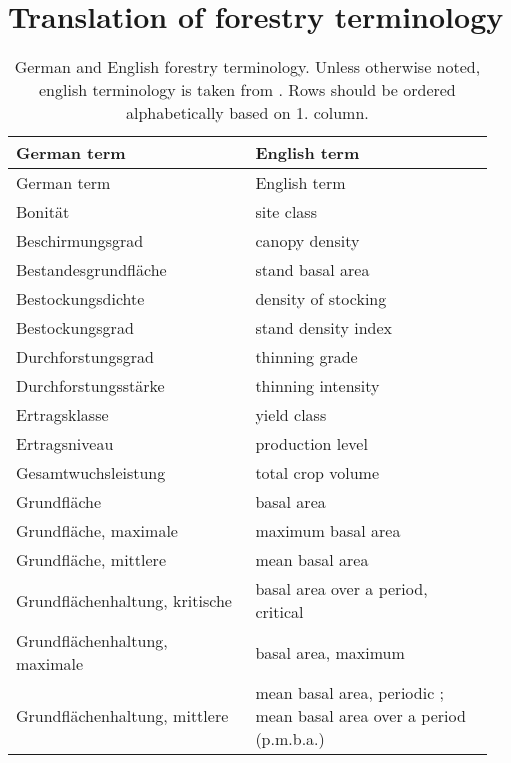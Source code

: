 \section{Translation of forestry terminology}

\begin{singlespace}
  {\tabulinesep=2mm
    \begin{longtabu}{p{0.475\linewidth} p{0.475\linewidth}}
      \caption{German and English forestry terminology. Unless otherwise noted, english terminology is taken from \textcite{Schmid-Haas1990}.  Rows should be ordered alphabetically based on 1. column.} \\
      \toprule
      German term & English term \\
      \midrule
      \endfirsthead
      German term & English term \\
      \midrule
      \endhead
      \bottomrule
      \endlastfoot
      Bonität & site class \\
      Beschirmungsgrad & canopy density \\
      Bestandesgrundfläche & stand basal area \\
      Bestockungsdichte & density of stocking \parencite[p.~38]{EFARES1953} \\
      Bestockungsgrad & stand density index \\
      Durchforstungsgrad & thinning grade \\
      Durchforstungsstärke & thinning intensity \\
      Ertragsklasse & yield class \\
      Ertragsniveau & production level \\
      Gesamtwuchsleistung & total crop volume \parencite[p.~152]{Assmann1970} \\
      Grundfläche & basal area \\
      Grundfläche, maximale & maximum basal area \parencite[p.~229]{Assmann1970} \\
      Grundfläche, mittlere & mean basal area \parencite[p.~216]{Assmann1970} \\
      Grundflächenhaltung, kritische & basal area over a period, critical \parencite[p.~229]{Assmann1970} \\
      Grundflächenhaltung, maximale & basal area, maximum \parencite[p.~229]{Assmann1970} \\
      Grundflächenhaltung, mittlere & mean basal area, periodic \parencite[p.~214]{Assmann1970}; mean basal area over a period (p.m.b.a.) \parencite[p.~216]{Assmann1970} \\

\end{longtabu}}
\end{singlespace}
